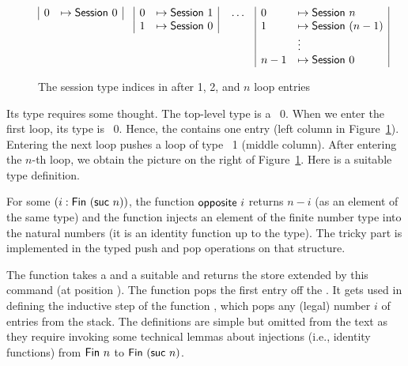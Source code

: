 \documentclass[acmsmall,screen,anonymous,review]{acmart}
\begin{document}
\begin{figure}[tp]
  \begin{align*}
    &
      \begin{array}[t]{|ll|}
        0 &\mapsto \ASession~0
      \end{array}
    &&
      \begin{array}[t]{|ll|}
        0 &\mapsto \ASession~1 \\
        1 &\mapsto \ASession~0
      \end{array}
          &&
             \dots
    &&
       \begin{array}[t]{|ll|}
         0 & \mapsto \ASession~n \\
         1 & \mapsto \ASession~(n-1) \\
           & \vdots \\
         n-1 & \mapsto \ASession~0
       \end{array}
  \end{align*}
  \caption{The session type indices in {\ACommandStore} after 1, 2, and $n$ loop entries}
  \label{fig:commandstore}
\end{figure}
Its type requires some thought.  The top-level type is a
{\ASession~0}. When we enter the first loop, its type is {\ASession~0}. Hence, the {\ACommandStore} contains
one entry (left column in Figure~\ref{fig:commandstore}).
Entering the next loop pushes a loop of type {\ASession~1}
(middle column). After entering the $n$-th loop, we obtain the
picture on the right of Figure~\ref{fig:commandstore}. Here is a
suitable type definition.
\rstCommandStore

For some $(i : \AFin~(\Asuc~ n))$, the function
$\AgdaFunction{opposite}~i$ returns $n-i$ (as an element of the same
type) and the function {\AtoN} injects an element of the finite number
type into the natural numbers (it is an identity function up to the type). The tricky part is implemented in the
typed push and pop operations on that structure.
\rstPops

The  function takes a {\ACommandStore} and a
suitable {\ACommand} and returns the store extended by this command
(at position {\Azero}). 
The  function pops the first entry off the
{\ACommandStore}. It gets used in defining the inductive step of the
function , which pops any (legal) number $i$ of entries
from the stack. The definitions are simple but omitted from the text
as they require invoking some technical lemmas about injections (i.e.,
identity functions) from $\AFin~n$ to $\AFin~(\Asuc~n)$.
\end{document}
